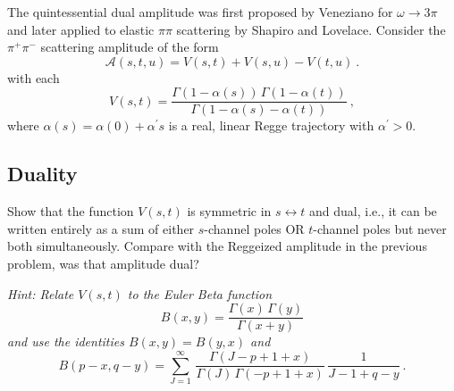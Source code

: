 The quintessential dual amplitude was first proposed by Veneziano for $\omega\to3\pi$ and later applied to elastic $\pi\pi$ scattering by Shapiro and Lovelace. Consider the $\pi^+\pi^-$ scattering amplitude of the form
    \begin{equation}
        \label{eq:Astu}
        \mathcal{A}(s,t,u) = V(s,t) + V(s,u) - V(t,u) ~.
    \end{equation}
with each 
    \begin{equation}   
        \label{eq:Fst}
        V(s,t) = \frac{\Gamma(1-\alpha(s)) \, \Gamma(1-\alpha(t))}{\Gamma(1-\alpha(s) - \alpha(t))} ~,
    \end{equation}
where $\alpha(s) = \alpha(0) + \alpha^\prime s$ is a real, linear Regge trajectory with $\alpha^\prime > 0$. 

\subsection{Duality} 
Show that the function $V(s,t)$ is symmetric in $s\leftrightarrow t$ and dual, i.e., it can be written entirely as a sum of either $s$-channel poles OR $t$-channel poles but never both simultaneously. Compare with the Reggeized amplitude in the previous problem, was that amplitude dual?

\noindent \textit{Hint: Relate $V(s,t)$ to the Euler Beta function
    \begin{equation}
        B(x,y) = \frac{\Gamma(x) \, \Gamma(y)}{\Gamma(x+y)}
    \end{equation}
and use the identities $B(x,y) = B(y,x)$ and
    \begin{equation}
        B(p-x, q-y) = \sum_{J=1}^\infty \, \frac{\Gamma(J-p+1 +x)}{\Gamma(J) \, \Gamma(-p + 1 +x)} \, \frac{1}{J-1+q-y} ~.
    \end{equation}
}

